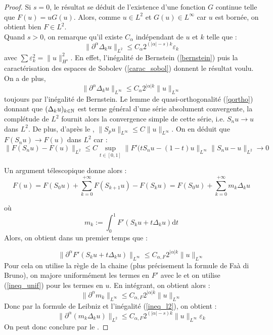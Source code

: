 \documentclass[11pt,a4paper]{article}
\begin{document}
\begin{proof}
Si $s=0$, le résultat se déduit de l'existence d'une fonction $G$ continue telle que $F(u)=uG(u)$. Alors, comme $u\in L^2$ et $G(u) \in L^{\infty}$ car $u$ est bornée, on obtient bien $F\in L^2$. \\
Quand $s>0$, on remarque qu'il existe $C_\alpha$  indépendant de $u$ et $k$ telle que  : 
\begin{equation}\label{ineq_l2}
\|\partial^\alpha \Delta_k u \|_{L^2} \leq C_\alpha 2^{(|\alpha|-s)k} \varepsilon_k
\end{equation}
avec $\sum \varepsilon_k^2 =  \|u\|_{H^s}^2$. En effet, l'inégalité de Bernstein (\ref{bernstein}) puis la caractérisation des espaces de Sobolev (\ref{carac_sobol}) donnent le résultat voulu. On a de plus,
\begin{equation}\label{ineq_unif}
\|\partial^\alpha \Delta_k u \|_{L^{\infty}} \leq C_\alpha 2^{|\alpha|k} \|u\|_{L^{\infty}}
\end{equation}
toujours par l'inégalité de Bernstein. Le lemme de quasi-orthogonalité (\ref{qortho}) donnant que $(\Delta_k u)_{k\in \mathbb N}$ est terme général d'une série absolument convergente, la complétude de $L^2$ fournit alors la convergence simple de cette série, i.e. $S_nu \to u$ dans $L^2$. De plus, d'après le ,  $\|S_pu\|_{L^\infty} \leq C \|u\|_{L^\infty}$. On en déduit que $F(S_nu) \to F(u)$ dans $L^2$ car :
\[ \| F(S_nu) - F(u)\|_{L^2} \leq C \sup_{t\in[0,1]} \|F'(tS_nu- (1-t)u \|_{L^\infty}\|S_nu-u\|_{L^2} \to 0 \]

Un argument télescopique donne alors : 
\begin{equation*}
F(u) = F(S_0 u) + \sum_{k=0}^{+\infty} F(S_{k+1} u) - F(S_k u) = F(S_0 u) + \sum_{k=0}^{+\infty} m_k \Delta_k u
\end{equation*}

où \[m_k := \int_0^1 F'(S_ku + t\Delta_ku)\mathrm{d}t\]
Alors, on obtient dans un premier temps que : 

\begin{equation*}
\| \partial^\alpha F'(S_ku + t\Delta_ku)\|_{L^{\infty}} \leq C_{\alpha,F} 2^{|\alpha|k} \|u\|_{L^{\infty}}
\end{equation*}
Pour cela on utilise la règle de la chaine (plus précisement la formule de Faà di Bruno), on majore uniformément les termes en $F'$ avec le  et on utilise (\ref{ineq_unif}) pour les termes en $u$.
En intégrant, on obtient alors :
\begin{equation*}
\|\partial^\alpha m_k \|_{L^\infty} \leq C_{\alpha,F} 2^{|\alpha|k} \|u\|_{L^{\infty}}
\end{equation*}
Donc par la formule de Leibniz et l'inégalité (\ref{ineq_l2}), on obtient :
\begin{equation*}
\|\partial^\alpha(m_k \Delta_k u) \|_{L^2} \leq C_{\alpha,F} 2^{(|\alpha|-s)k} \|u\|_{L^{\infty}} \varepsilon_k
\end{equation*}
On peut donc conclure par le .
\end{proof}


\newpage
\printbibliography[heading=bibintoc, title={Références}]
\end{document}
